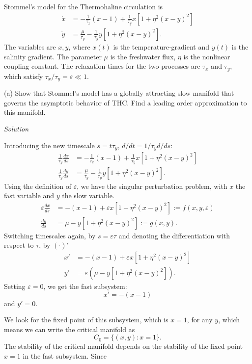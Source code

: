 \begin{solution}[9.7]
Stommel's model for the Thermohaline circulation is 
\begin{align}
   \label{eqstomm}
    \dot{x} &= -\frac{1}{\tau_x}(x-1) + \frac{1}{\tau_y}x[1+\eta^2(x-y)^2] \\
    \dot{y} & = \frac{\mu}{\tau_y} - \frac{1}{\tau_y}y[1+\eta^2(x-y)^2].
\end{align}
The variables are $x,y$, where $x(t)$ is the temperature-gradient and $y(t)$ is the salinity gradient. The parameter $\mu$ is the freshwater flux, $\eta$ is the nonlinear coupling constant. The relaxation times for the two processes are $\tau_x$ and $\tau_y$, which satisfy $\tau_x/\tau_y = \varepsilon \ll 1$.

(a) Show that Stommel's model has a globally attracting slow manifold that governs the asymptotic behavior of THC. Find a leading order approximation to this manifold. 

\emph{Solution}

Introducing the new timescale $s=t\tau_y$, $d/dt = 1/\tau_y d/ds$:
\begin{align*}
    \frac{1}{\tau_y}\frac{dx}{ds} &= -\frac{1}{\tau_x}(x-1) + \frac{1}{\tau_y}x[1+\eta^2(x-y)^2] \\
    \frac{1}{\tau_y}\frac{dy}{ds} & = \frac{\mu}{\tau_y} - \frac{1}{\tau_y}y[1+\eta^2(x-y)^2].
\end{align*}
Using the definition of $\varepsilon$, we have the singular perturbation problem, with $x$ the fast variable and $y$ the slow variable. 
\begin{align}
\label{eqfast1}
    \varepsilon\frac{dx}{ds} &= -(x-1) + \varepsilon x[1+\eta^2(x-y)^2]:=f(x,y,\varepsilon) \\
    \label{eqfast2}
    \frac{dy}{ds} & = \mu - y[1+\eta^2(x-y)^2] :=g(x,y).
\end{align}
Switching timescales again, by $s=\varepsilon \tau$ and denoting the differentiation with respect to $\tau$, by $(\cdot)'$ 
\begin{align*}
    x' &= -(x-1) + \varepsilon x[1+\eta^2(x-y)^2] \\
    y' & = \varepsilon\left(\mu - y[1+\eta^2(x-y)^2]\right).
\end{align*}
Setting $\varepsilon = 0$, we get the fast subsystem:
$$
x' = -(x-1) 
$$
and $y' = 0$.

We look for the fixed point of this subsystem, which is $x=1$, for any $y$, which means we can write the critical manifold as
\begin{equation}
    C_0 = \{ (x,y): x = 1\}. 
\end{equation}
The stability of the critical manifold depends on the stability of the fixed point $x=1$ in the fast subsystem. Since 


\end{solution}
